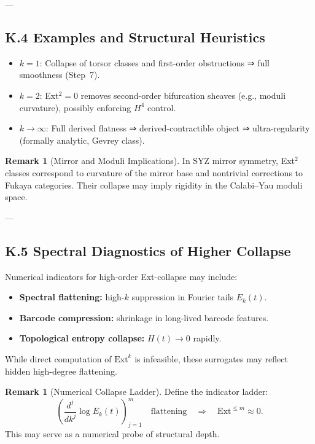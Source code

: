 \documentclass[11pt]{article}
\theoremstyle{definition}
\newtheorem{remark}[theorem]{Remark}
\begin{document}
---

\subsection*{K.4 Examples and Structural Heuristics}

\begin{itemize}
  \item \( k = 1 \): Collapse of torsor classes and first-order obstructions ⇒ full smoothness (Step~7).
  \item \( k = 2 \): Ext$^2 = 0$ removes second-order bifurcation sheaves (e.g., moduli curvature), possibly enforcing $H^4$ control.
  \item \( k \to \infty \): Full derived flatness ⇒ derived-contractible object ⇒ ultra-regularity (formally analytic, Gevrey class).
\end{itemize}

\begin{remark}[Mirror and Moduli Implications]
In SYZ mirror symmetry, Ext$^2$ classes correspond to curvature of the mirror base and nontrivial corrections to Fukaya categories.  
Their collapse may imply rigidity in the Calabi--Yau moduli space.
\end{remark}

---

\subsection*{K.5 Spectral Diagnostics of Higher Collapse}

Numerical indicators for high-order Ext-collapse may include:
\begin{itemize}
  \item \textbf{Spectral flattening:} high-$k$ suppression in Fourier tails \( E_k(t) \).
  \item \textbf{Barcode compression:} shrinkage in long-lived barcode features.
  \item \textbf{Topological entropy collapse:} \( H(t) \to 0 \) rapidly.
\end{itemize}

While direct computation of \( \mathrm{Ext}^k \) is infeasible, these surrogates may reflect hidden high-degree flattening.

\begin{remark}[Numerical Collapse Ladder]
Define the indicator ladder:
\[
\left( \frac{d^j}{dk^j} \log E_k(t) \right)_{j=1}^m \quad \text{flattening} \quad \Rightarrow \quad \mathrm{Ext}^{\leq m} \approx 0.
\]
This may serve as a numerical probe of structural depth.
\end{remark}
\end{document}
